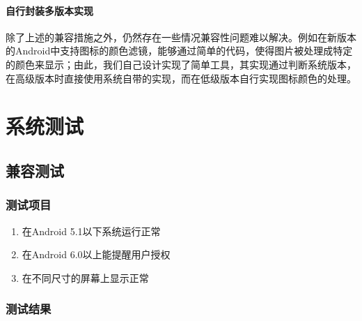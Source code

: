 \documentclass[format=final, language=chinese, degree=fyp]{hustthesis}
\begin{document}
\subsubsection{自行封装多版本实现}

除了上述的兼容措施之外，仍然存在一些情况兼容性问题难以解决。例如在新版本的Android中支持图标的颜色滤镜，能够通过简单的代码，使得图片被处理成特定的颜色来显示；由此，我们自己设计实现了简单工具，其实现通过判断系统版本，在高级版本时直接使用系统自带的实现，而在低级版本自行实现图标颜色的处理。

\chapter{系统测试}

\section{兼容测试}

\subsection{测试项目}

\begin{enumerate}
	\item 在Android 5.1以下系统运行正常
	\item 在Android 6.0以上能提醒用户授权
	\item 在不同尺寸的屏幕上显示正常
\end{enumerate}

\subsection{测试结果}
\end{document}
